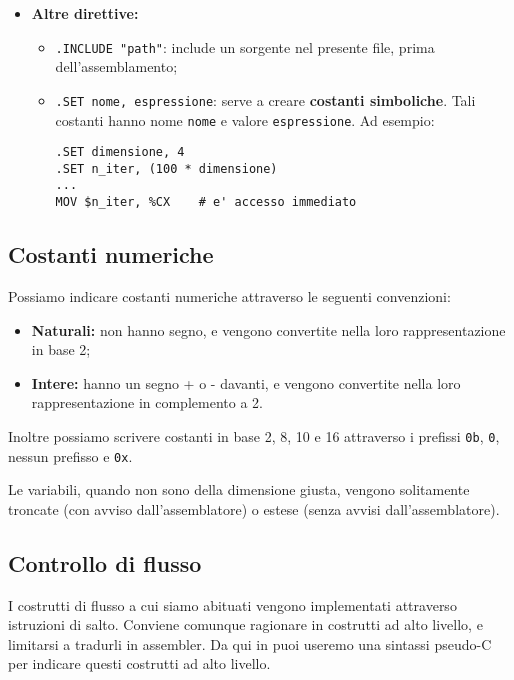 \documentclass[a4paper,11pt]{article}
\begin{document}
\begin{itemize}
\item \textbf{Altre direttive:}
	\begin{itemize}
		\item \lstinline|.INCLUDE "path"|: include un sorgente nel presente file, prima dell'assemblamento;
		\item \lstinline|.SET nome, espressione|: serve a creare \textbf{costanti simboliche}. 
			Tali costanti hanno nome \lstinline|nome| e valore \lstinline|espressione|. Ad esempio:
\begin{lstlisting}	
.SET dimensione, 4
.SET n_iter, (100 * dimensione)
...
MOV $n_iter, %CX	# e' accesso immediato
\end{lstlisting}
	\end{itemize}
\end{itemize}

\subsection{Costanti numeriche}
Possiamo indicare costanti numeriche attraverso le seguenti convenzioni:
\begin{itemize}
	\item \textbf{Naturali:} non hanno segno, e vengono convertite nella loro rappresentazione in base 2;
	\item \textbf{Intere:} hanno un segno + o - davanti, e vengono convertite nella loro rappresentazione in complemento a 2.
\end{itemize}

Inoltre possiamo scrivere costanti in base 2, 8, 10 e 16 attraverso i prefissi \lstinline|0b|, \lstinline|0|, nessun prefisso e \lstinline|0x|.

Le variabili, quando non sono della dimensione giusta, vengono solitamente troncate (con avviso dall'assemblatore) o estese (senza avvisi dall'assemblatore).

\subsection{Controllo di flusso}
I costrutti di flusso a cui siamo abituati vengono implementati attraverso istruzioni di salto.
Conviene comunque ragionare in costrutti ad alto livello, e limitarsi a tradurli in assembler.
Da qui in puoi useremo una sintassi pseudo-C per indicare questi costrutti ad alto livello.
\end{document}
